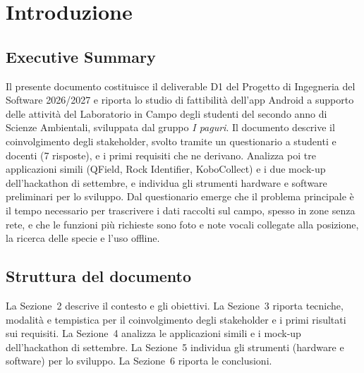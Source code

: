 \section{Introduzione}

\subsection{Executive Summary}
Il presente documento costituisce il deliverable D1 del Progetto di Ingegneria del Software 2026/2027
e riporta lo studio di fattibilità dell'app Android a supporto delle attività del Laboratorio in Campo
degli studenti del secondo anno di Scienze Ambientali, sviluppata dal gruppo \emph{I paguri}.
Il documento descrive il coinvolgimento degli stakeholder, svolto tramite un questionario a studenti e docenti (7 risposte), e i primi requisiti che ne derivano. Analizza poi tre applicazioni simili (QField, Rock Identifier, KoboCollect) e i due mock-up dell'hackathon di settembre, e individua gli strumenti hardware e software preliminari per lo sviluppo. Dal questionario emerge che il problema principale è il tempo necessario per trascrivere i dati raccolti sul campo, spesso in zone senza rete, e che le funzioni più richieste sono foto e note vocali collegate alla posizione, la ricerca delle specie e l'uso offline.

\subsection{Struttura del documento}
La Sezione~2 descrive il contesto e gli obiettivi. La Sezione~3 riporta tecniche, modalità e tempistica
per il coinvolgimento degli stakeholder e i primi risultati sui requisiti. La Sezione~4 analizza le
applicazioni simili e i mock-up dell'hackathon di settembre. La Sezione~5 individua gli strumenti
(hardware e software) per lo sviluppo. La Sezione~6 riporta le conclusioni.
